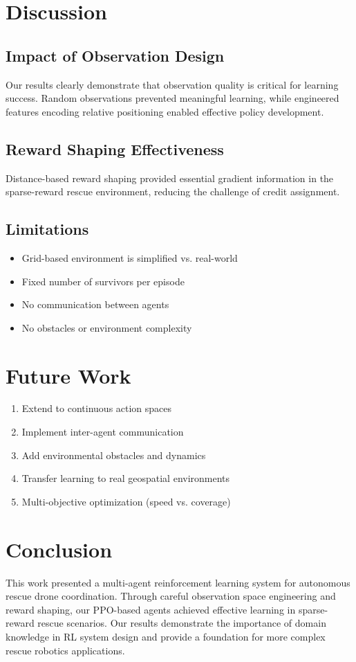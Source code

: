 \documentclass[conference]{IEEEtran}
\begin{document}
\section{Discussion}
\subsection{Impact of Observation Design}
Our results clearly demonstrate that observation quality is critical for learning success. Random observations prevented meaningful learning, while engineered features encoding relative positioning enabled effective policy development.

\subsection{Reward Shaping Effectiveness}
Distance-based reward shaping provided essential gradient information in the sparse-reward rescue environment, reducing the challenge of credit assignment.

\subsection{Limitations}
\begin{itemize}
    \item Grid-based environment is simplified vs. real-world
    \item Fixed number of survivors per episode
    \item No communication between agents
    \item No obstacles or environment complexity
\end{itemize}

\section{Future Work}
\begin{enumerate}
    \item Extend to continuous action spaces
    \item Implement inter-agent communication
    \item Add environmental obstacles and dynamics
    \item Transfer learning to real geospatial environments
    \item Multi-objective optimization (speed vs. coverage)
\end{enumerate}

\section{Conclusion}
This work presented a multi-agent reinforcement learning system for autonomous rescue drone coordination. Through careful observation space engineering and reward shaping, our PPO-based agents achieved effective learning in sparse-reward rescue scenarios. Our results demonstrate the importance of domain knowledge in RL system design and provide a foundation for more complex rescue robotics applications.
\end{document}
